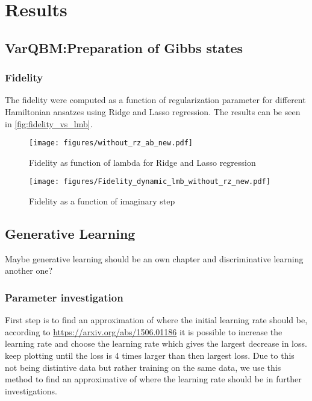 \documentclass[../main.tex]{subfiles}
\begin{document}
\chapter{Results}
\label{sec:seventh}

\section{VarQBM:Preparation of Gibbs states}
\subsection{Fidelity}
The fidelity were computed as a function of regularization parameter for different Hamiltonian ansatzes using Ridge and Lasso regression. The results can be seen in \autoref{fig:fidelity_vs_lmb}.

\begin{figure}
    \begin{center}
        \texttt{[image: figures/without\_rz\_ab\_new.pdf]}
        \caption{Fidelity as function of lambda for Ridge and Lasso regression}
        \label{fig:fidelity_vs_lmb}
    \end{center}
\end{figure}


\begin{figure}
    \begin{center}
        \texttt{[image: figures/Fidelity\_dynamic\_lmb\_without\_rz\_new.pdf]}
        \caption{Fidelity as a function of imaginary step}
        \label{fig:nolabel}
    \end{center}
\end{figure}

\section{Generative Learning}
Maybe generative learning should be an own chapter and discriminative learning another one?

\subsection{Parameter investigation}

First step is to find an approximation of where the initial learning rate should be, according to \url{https://arxiv.org/abs/1506.01186} it is possible to increase the learning rate and choose the learning rate which gives the largest decrease in loss. keep plotting until the loss is 4 times larger than then largest loss. Due to this not being distintive data but rather training on the same data, we use this method to find an approximative of where the learning rate should be in further investigations.
\end{document}
